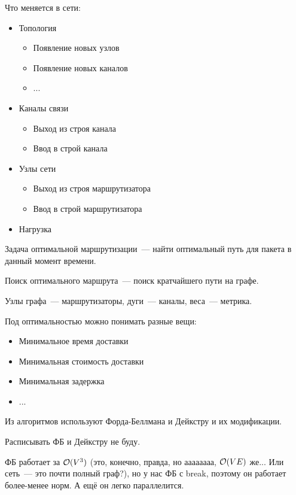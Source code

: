 Что меняется в сети:
\begin{itemize}
    \item Топология
    \begin{itemize}
        \item Появление новых узлов
        \item Появление новых каналов
        \item ...
    \end{itemize}
    \item Каналы связи
    \begin{itemize}
        \item Выход из строя канала
        \item Ввод в строй канала
    \end{itemize}
    \item Узлы сети
    \begin{itemize}
        \item Выход из строя маршрутизатора
        \item Ввод в строй маршрутизатора
    \end{itemize}
    \item Нагрузка
\end{itemize}


Задача оптимальной маршрутизации~--- найти оптимальный путь для пакета в данный момент времени.

Поиск оптимального маршрута~--- поиск кратчайшего пути на графе.

Узлы графа~--- маршрутизаторы, дуги~--- каналы, веса~--- метрика.

Под оптимальностью можно понимать разные вещи:
\begin{itemize}
    \item Минимальное время доставки
    \item Минимальная стоимость доставки
    \item Минимальная задержка
    \item ...
\end{itemize}

Из алгоритмов используют Форда-Беллмана и Дейкстру и их модификации.

Расписывать ФБ и Дейкстру не буду.

ФБ работает за $\mathcal{O}(V^3)$ (это, конечно, правда, но аааааааа, $\mathcal{O}(VE)$ же... Или сеть~--- это почти полный граф?), но у нас ФБ с break, поэтому он работает более-менее норм. А ещё он легко параллелится.

